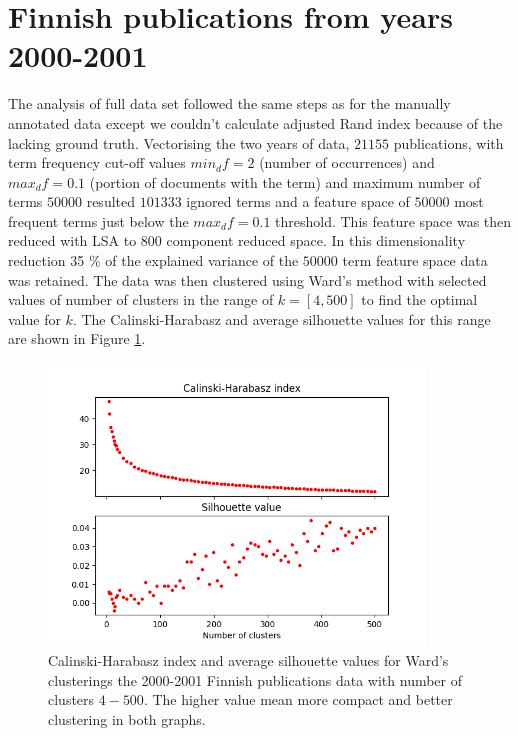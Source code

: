 \section{Finnish publications from years 2000-2001}
The analysis of full data set followed the same steps as for 
the manually annotated data except we couldn't calculate adjusted
Rand index because of the lacking ground truth.
Vectorising the two years of data, $21155$ publications, with term 
frequency cut-off values $min_df=2$
(number of occurrences) and $max_df=0.1$ (portion of documents with
the term) and maximum number of terms $50000$ resulted $101333$ 
ignored terms and a feature space of $50000$ most frequent terms 
just below the $max_df=0.1$ threshold. 
This feature space was then reduced with LSA to $800$ component 
reduced space. In this dimensionality reduction 35 \% of the 
explained variance of the $50000$ term feature space data was retained.
The data was then clustered using Ward's method with selected 
values of number of clusters in the range of $k=[4,500]$ to find 
the optimal value for $k$.
The Calinski-Harabasz and average silhouette values for this range
are shown in Figure \ref{fig:ch-silh-2000-h}.
\begin{figure}[htp]
  \begin{center}    
\includegraphics[width=10cm]{images/c-h-silh-index-plot-22000-4_500-800-hierarchical.png}
    \caption{Calinski-Harabasz index and average silhouette values 
    for Ward's clusterings the 2000-2001 Finnish publications data
    with number of clusters $4-500$. The higher value mean more 
    compact and better clustering in both graphs.}
    \label{fig:ch-silh-2000-h}
  \end{center}
\end{figure}
